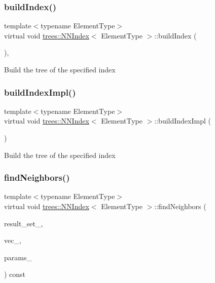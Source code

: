 \subsubsection{\texorpdfstring{build\+Index()}{buildIndex()}}
{\footnotesize\ttfamily template$<$typename Element\+Type$>$ \\
virtual void \hyperlink{classtrees_1_1_n_n_index}{trees\+::\+N\+N\+Index}$<$ Element\+Type $>$\+::build\+Index (\begin{DoxyParamCaption}{ }\end{DoxyParamCaption})\hspace{0.3cm}{\ttfamily [inline]}, {\ttfamily [virtual]}}

Build the tree of the specified index \mbox{\label{classtrees_1_1_n_n_index_a3a280e25b04449f34c4ed0fcc419e7b1}} 
\subsubsection{\texorpdfstring{build\+Index\+Impl()}{buildIndexImpl()}}
{\footnotesize\ttfamily template$<$typename Element\+Type$>$ \\
virtual void \hyperlink{classtrees_1_1_n_n_index}{trees\+::\+N\+N\+Index}$<$ Element\+Type $>$\+::build\+Index\+Impl (\begin{DoxyParamCaption}{ }\end{DoxyParamCaption})\hspace{0.3cm}{\ttfamily [pure virtual]}}

Build the tree of the specified index \mbox{\label{classtrees_1_1_n_n_index_af48da46453e78744d8874c529e06b5ff}} 
\subsubsection{\texorpdfstring{find\+Neighbors()}{findNeighbors()}}
{\footnotesize\ttfamily template$<$typename Element\+Type$>$ \\
virtual void \hyperlink{classtrees_1_1_n_n_index}{trees\+::\+N\+N\+Index}$<$ Element\+Type $>$\+::find\+Neighbors (\begin{DoxyParamCaption}\item[{\hyperlink{classtrees_1_1_result_set}{Result\+Set}$<$ Element\+Type $>$ \&}]{result\+\_\+set\+\_\+,  }\item[{const Element\+Type $\ast$}]{vec\+\_\+,  }\item[{const \hyperlink{structtrees_1_1_tree_params}{Tree\+Params} \&}]{params\+\_\+ }\end{DoxyParamCaption}) const\hspace{0.3cm}{\ttfamily [pure virtual]}}

